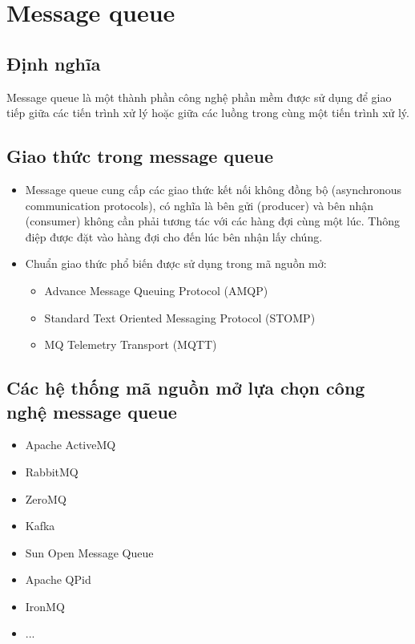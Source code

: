 \section{Message queue}
\subsection{Định nghĩa}
Message queue là một thành phần công nghệ phần mềm được sử dụng để giao tiếp giữa các tiến trình xử lý hoặc giữa các luồng trong cùng một tiến trình xử lý.

\subsection{Giao thức trong message queue}
\begin{itemize}
\item Message queue cung cấp các giao thức kết nối không đồng bộ (asynchronous communication protocols), có nghĩa là bên gửi (producer) và bên nhận (consumer) không cần phải tương tác với các hàng đợi cùng một lúc. Thông điệp được đặt vào hàng đợi cho đến lúc bên nhận lấy chúng.
\item Chuẩn giao thức phổ biến được sử dụng trong mã nguồn mở:
\begin{itemize}
	\item Advance Message Queuing Protocol (AMQP)
	\item Standard Text Oriented Messaging Protocol (STOMP)
	\item MQ Telemetry Transport (MQTT)
\end{itemize}
\end{itemize}

\subsection{Các hệ thống mã nguồn mở lựa chọn công nghệ message queue}

\begin{itemize}
	\item Apache ActiveMQ
	\item RabbitMQ
	\item ZeroMQ
	\item Kafka
	\item Sun Open Message Queue
	\item Apache QPid
	\item IronMQ
	\item ...
\end{itemize}